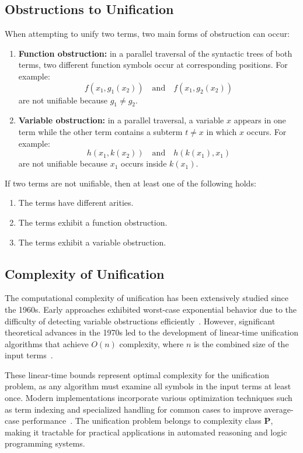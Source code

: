 \subsection{Obstructions to Unification}
When attempting to unify two terms, two main forms of obstruction can occur:
\begin{enumerate}
    \item \textbf{Function obstruction:} in a parallel traversal of the syntactic trees of both terms, two different function symbols occur at corresponding positions. For example:
    \[
    f(x_1, g_1(x_2)) \quad\text{and}\quad f(x_1, g_2(x_2))
    \]
    are not unifiable because \(g_1 \neq g_2\).
    \item \textbf{Variable obstruction:} in a parallel traversal, a variable \(x\) appears in one term while the other term contains a subterm \(t \neq x\) in which \(x\) occurs. For example:
    \[
    h(x_1, k(x_2)) \quad\text{and}\quad h(k(x_1), x_1)
    \]
    are not unifiable because \(x_1\) occurs inside \(k(x_1)\).
\end{enumerate}

\begin{proposition}
If two terms are not unifiable, then at least one of the following holds:
\begin{enumerate}
    \item The terms have different arities.
    \item The terms exhibit a function obstruction.
    \item The terms exhibit a variable obstruction.
\end{enumerate}
\end{proposition}

\subsection{Complexity of Unification}
The computational complexity of unification has been extensively studied since the 1960s.
Early approaches exhibited worst-case exponential behavior due to the difficulty of detecting variable obstructions efficiently~\cite{robinson1965}.
However, significant theoretical advances in the 1970s led to the development of linear-time unification algorithms that achieve \(O(n)\) complexity, where \(n\) is the combined size of the input terms~\cite{martelli1976, paterson1978}.

These linear-time bounds represent optimal complexity for the unification problem, as any algorithm must examine all symbols in the input terms at least once.
Modern implementations incorporate various optimization techniques such as term indexing and specialized handling for common cases to improve average-case performance~\cite{baader2001}.
The unification problem belongs to complexity class \textbf{P}, making it tractable for practical applications in automated reasoning and logic programming systems.


